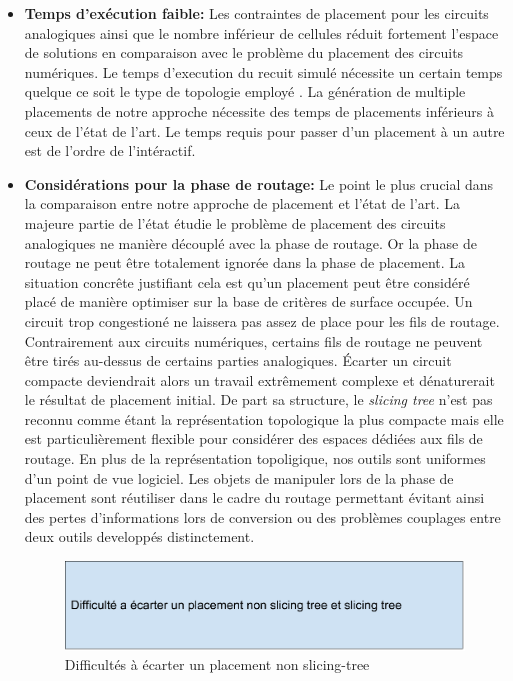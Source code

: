 \begin{itemize}
\item \textbf{Temps d'exécution faible:} Les contraintes de placement pour les circuits analogiques ainsi que le nombre inférieur de cellules réduit fortement l'espace de solutions en comparaison avec le problème du placement des circuits numériques. Le temps d'execution du recuit simulé nécessite un certain temps quelque ce soit le type de topologie employé \cite{Xiao10}. La génération de multiple placements de notre approche nécessite des temps de placements inférieurs à ceux de l'état de l'art. Le temps requis pour passer d'un placement à un autre est de l'ordre de l'intéractif.

\item \textbf{Considérations pour la phase de routage:} Le point le plus crucial dans la comparaison entre notre approche de placement et l'état de l'art. La majeure partie de l'état étudie le problème de placement des circuits analogiques ne manière découplé avec la phase de routage. Or la phase de routage ne peut être totalement ignorée dans la phase de placement. La situation concrête justifiant cela est qu'un placement peut être considéré placé de manière optimiser sur la base de critères de surface occupée. Un circuit trop congestioné ne laissera pas assez de place pour les fils de routage. Contrairement aux circuits numériques, certains fils de routage ne peuvent être tirés au-dessus de certains parties analogiques. \'Ecarter un circuit compacte deviendrait alors un travail extrêmement complexe et dénaturerait le résultat de placement initial. De part sa structure, le {\it slicing tree} n'est pas reconnu comme étant la représentation topologique la plus compacte mais elle est particulièrement flexible pour considérer des espaces dédiées aux fils de routage. En plus de la représentation topoligique, nos outils sont uniformes d'un point de vue logiciel. Les objets de manipuler lors de la phase de placement sont réutiliser dans le cadre du routage permettant évitant ainsi des pertes d'informations lors de conversion ou des problèmes couplages entre deux outils developpés distinctement.
\begin{figure}[t]
\begin{center}
\includegraphics[height=0.10\textheight]{Figures/8.pdf}
\caption{Difficultés à écarter un placement non slicing-tree}
\label{fig:8}
\end{center}
\end{figure}
\end{itemize}
